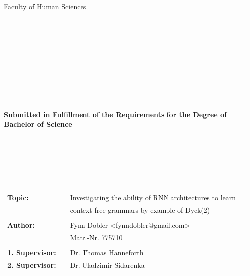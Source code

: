 \begin{center}
\Large{Faculty of Human Sciences}
\end{center}
\begin{verbatim}




\end{verbatim}
\begin{center}
\doublespacing
\textbf{\LARGE{\titleDocument}}\\
\singlespacing
\begin{verbatim}

\end{verbatim}
\textbf{{~\subjectDocument~}}
\end{center}
\begin{verbatim}

\end{verbatim}
\begin{center}

\end{center}
\begin{verbatim}

\end{verbatim}
\begin{center}
\textbf{Submitted in Fulfillment of the Requirements for the Degree of \\ Bachelor of Science}
\end{center}
\begin{verbatim}






\end{verbatim}
\begin{flushleft}
\begin{tabular}{llll}
\textbf{Topic:} & & Investigating the ability of RNN architectures to learn & \\
& & context-free grammars by example of Dyck(2) & \\
& & \\
\textbf{Author:} & & Fynn Dobler <fynndobler@gmail.com>& \\
& & Matr.-Nr. 775710 & \\
& & \\
\textbf{1. Supervisor:} & & Dr. Thomas Hanneforth &\\
\textbf{2. Supervisor:} & & Dr. Uladzimir Sidarenka &\\
\end{tabular}
\end{flushleft}
